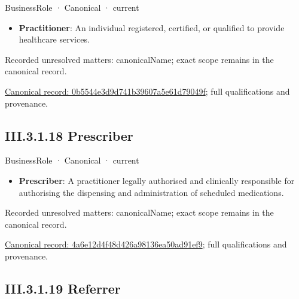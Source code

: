 \label{element:0b5544e3d9d741b39607a5e61d79049f}
{\small BusinessRole · Canonical · current}\par

\begin{itemize}


\item \textbf{Practitioner}: An individual registered, certified, or qualified to provide healthcare services.

\end{itemize}

{\small Recorded unresolved matters: canonicalName; exact scope remains in the canonical record.}\par
{\footnotesize \href{../../../../../../../continuum/business/business-role/0b5544e3d9d741b39607a5e61d79049f.md}{Canonical record: 0b5544e3d9d741b39607a5e61d79049f}; full qualifications and provenance.}\par
\subsection*{III.3.1.18 Prescriber}
\label{navigation:III.3.1.18}

\label{element:4a6e12d4f48d426a98136ea50ad91ef9}
{\small BusinessRole · Canonical · current}\par

\begin{itemize}


\item \textbf{Prescriber}: A practitioner legally authorised and clinically responsible for authorising the dispensing and administration of scheduled medications.

\end{itemize}

{\small Recorded unresolved matters: canonicalName; exact scope remains in the canonical record.}\par
{\footnotesize \href{../../../../../../../continuum/business/business-role/4a6e12d4f48d426a98136ea50ad91ef9.md}{Canonical record: 4a6e12d4f48d426a98136ea50ad91ef9}; full qualifications and provenance.}\par
\subsection*{III.3.1.19 Referrer}
\label{navigation:III.3.1.19}

